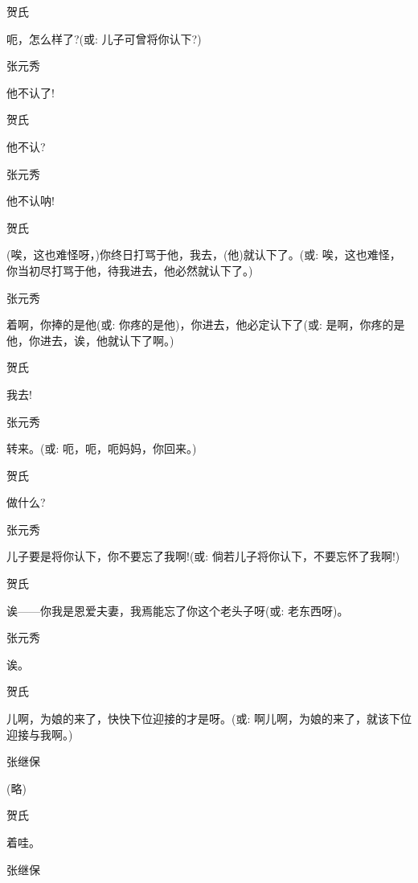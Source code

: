 贺氏\hspace{30pt}~

呃，怎么样了?({\akai 或}: 儿子可曾将你认下?)

张元秀\hspace{20pt}~

他不认了!

贺氏\hspace{30pt}~

他不认?

张元秀\hspace{20pt}~

他不认呐!

贺氏

(唉，这也难怪呀，)你终日打骂于他，我去，(他)就认下了。({\akai 或}: 唉，这也难怪，你当初尽打骂于他，待我进去，他必然就认下了。)

张元秀

着啊，你捧的是他({\akai 或}: 你疼的是他)，你进去，他必定认下了({\akai 或}: 是啊，你疼的是他，你进去，诶，他就认下了啊。)

贺氏\hspace{30pt}~

我去!

张元秀\hspace{20pt}~

转来。({\akai 或}: 呃，呃，呃妈妈，你回来。)

贺氏\hspace{30pt}~

做什么?

张元秀

儿子要是将你认下，你不要忘了我啊!({\akai 或}: 倘若儿子将你认下，不要忘怀了我啊!)

贺氏\hspace{30pt}~

诶------你我是恩爱夫妻，我焉能忘了你这个老头子呀({\akai 或}: 老东西呀)。

张元秀\hspace{20pt}~

诶。

贺氏

儿啊，为娘的来了，快快下位迎接的才是呀。({\akai 或}: 啊儿啊，为娘的来了，就该下位迎接与我啊。)

张继保\hspace{20pt}~

(略)

贺氏\hspace{30pt}~

着哇。

张继保\hspace{20pt}~

